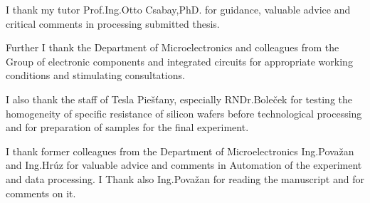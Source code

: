 \iffalse
\par Ďakujem svojmu školiteľovi Prof. Ing. Ottovi Csabayovi, DrSc. za
usmerňovanie, cenné rady a kritické pripomienky pri spracovaní
predloženej kandidátskej práce.
\par Ďakujem ďalej vedeniu Katedry mikroelektroniky a kolegom z
Oddelenia elektronických prvkov a integrovaných obvodov za vytvorené
pracovné podmienky a podnetné konzultácie.
\par Ďakujem tiež pracovníkom Tesly Piešťany, najmä RNDr.Bolečkovi za
otestovanie homogenity špecifického odporu kremíkových dosiek pred
technologickým spracovaním a za prípravu vzoriek pre záverečný
experiment.
\par Ďakujem bývalým pracovníkom Katedry mikroelektroniky
Ing.Považanovi a Ing.Hrúzovi za cenné rady a pripomienky v oblasti
automatizácie experimentu a spracovania dát. Ing.Považanovi ďakujem aj
za prečítanie práce a pripomienky k nej.
\fi

\par
I thank my tutor Prof.Ing.Otto Csabay,PhD. for guidance, valuable
advice and critical comments in processing submitted thesis.

\par
Further I thank the Department of Microelectronics and colleagues from
the Group of electronic components and integrated circuits for
appropriate working conditions and stimulating consultations.

\par
I also thank the staff of Tesla Piešťany, especially RNDr.Boleček for
testing the homogeneity of specific resistance of silicon wafers
before technological processing and for preparation of samples for the
final experiment.

\par
I thank former colleagues from the Department of Microelectronics
Ing.Považan and Ing.Hrúz for valuable advice and comments in
Automation of the experiment and data processing. I Thank also
Ing.Považan for reading the manuscript and for comments on it.
